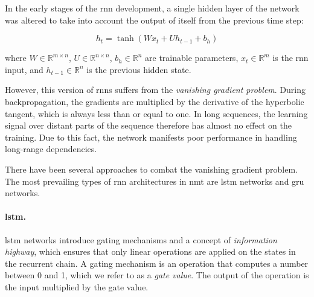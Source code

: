In the early stages of the \ac{rnn} development, a single hidden layer of the
network was altered to take into account the output of itself from the previous
time step:

%

\begin{equation} h_t = \tanh ( W x_t + U h_{t-1} + b_h ) \label{eq:vanilla-rnn}
\end{equation}

\noindent where $W \in \mathbb{R}^{m \times n}$,
$U \in \mathbb{R}^{n \times n}$, $b_h \in \mathbb{R}^{n}$ are trainable
parameters, $x_t \in \mathbb{R}^{m}$ is the \ac{rnn} input, and
$h_{t-1} \in \mathbb{R}^{n}$ is the previous hidden state.

However, this version of \acp{rnn} suffers from the \emph{vanishing gradient
  problem}. During backpropagation, the gradients are multiplied by the
derivative of the hyperbolic tangent, which is always less than or equal to
one. In long sequences, the learning signal over distant parts of the sequence
therefore has almost no effect on the training. Due to this fact, the network
manifests poor performance in handling long-range dependencies.

There have been several approaches to combat the vanishing gradient problem.
The most prevailing types of \ac{rnn} architectures in \ac{nmt} are \ac{lstm}
networks and \ac{gru} networks.

\paragraph{\acs{lstm}.} \acl{lstm} networks
\citep{hochreiter1997long,gers2000learning} introduce gating mechanisms and a
concept of \emph{information highway}, which ensures that only linear
operations are applied on the states in the recurrent chain. A gating mechanism
is an operation that computes a number between 0 and 1, which we refer to as a
\emph{gate value}.  The output of the operation is the input multiplied by the
gate value.

